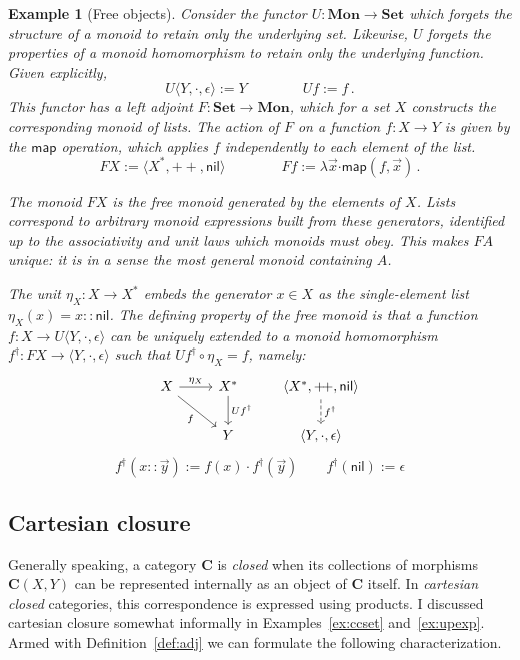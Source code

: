 \documentclass[11pt,oneside]{book}
\newtheorem{example}[theorem]{Example}
\theoremstyle{definition}
\newcommand{\kw}[1]{\ensuremath{ \mathsf{#1} }}
\newcommand{\bdot}{\boldsymbol{\cdot}}
\begin{document}
\begin{example}[Free objects] %
Consider the functor $U : \mathbf{Mon} \rightarrow \mathbf{Set}$
which forgets the structure of a monoid
to retain only the underlying set.
Likewise,
$U$ forgets the properties of a monoid homomorphism
to retain only the underlying function.
Given explicitly,
\[
  U \langle Y, {\cdot}, \epsilon \rangle := Y
  \qquad \qquad
  U f := f
  \,.
\]
This functor has a left adjoint
$F : \mathbf{Set} \rightarrow \mathbf{Mon}$,
which for a set $X$
constructs the corresponding monoid of lists.
The action of $F$ on a function $f : X \rightarrow Y$
is given by the $\kw{map}$ operation,
which applies $f$ independently
to each element of the list.
\[
  F X := \langle X^*, {+\!+}, \kw{nil} \rangle
  \qquad \qquad
  F f := \lambda \vec{x} \bdot \kw{map}(f, \vec{x})
  \,.
\]

The monoid $F X$ is the \emph{free monoid}
generated by the elements of $X$.
Lists correspond to arbitrary monoid expressions
built from these generators,
identified up to
the associativity and unit laws
which monoids must obey.
This makes $F A$ unique:
it is in a sense the most general monoid
containing $A$.

The unit $\eta_X : X \rightarrow X^*$
embeds the generator $x \in X$ as the single-element list
$\eta_X(x) = x :: \kw{nil}$.
The defining property of the free monoid is that
a function $f : X \rightarrow U \langle Y, {\cdot}, \epsilon \rangle$
can be uniquely extended to a monoid homomorphism
$f^\dagger : F X \rightarrow \langle Y, {\cdot}, \epsilon \rangle$
such that $U f^\dagger \circ \eta_X = f$,
namely:
\[
  \begin{tikzcd}
    X \ar[r, "\eta_X"] \ar[dr, "f"'] &
    X^* \ar[d, "U f^\dagger"] &
    \langle X^*, {+\!+}, \kw{nil} \rangle
      \ar[d, "f^\dagger", dashed] \\ &
    Y &
    \langle Y, {\cdot}, \epsilon \rangle
  \end{tikzcd}
\]
\[
  f^\dagger(x :: \vec{y}) := f(x) \cdot f^\dagger(\vec{y})
  \qquad
  f^\dagger(\kw{nil}) := \epsilon
\]
\end{example}


\subsection{Cartesian closure} %

Generally speaking,
a category $\mathbf{C}$ is \emph{closed} when
its collections of morphisms $\mathbf{C}(X, Y)$
can be represented internally as an object of $\mathbf{C}$ itself.
In \emph{cartesian closed} categories,
this correspondence is expressed using products.
I discussed cartesian closure somewhat informally
in Examples~\ref{ex:ccset} and~\ref{ex:upexp}.
Armed with Definition~\ref{def:adj} we can formulate
the following characterization.
\end{document}
